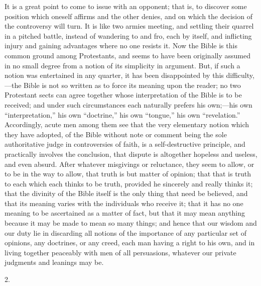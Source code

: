 It is a great point to come to issue with an opponent; that is, to
discover some position which oneself affirms and the other denies, and
on which the decision of the controversy will turn. It is like two
armies meeting, and settling their quarrel in a pitched battle,
instead of wandering to and fro, each by itself, and inflicting injury
and gaining advantages where no one resists it. Now the Bible is this
common ground among Protestants, and seems to have been originally
assumed in no small degree from a notion of its simplicity in
argument. But, if such a notion was entertained in any quarter, it has
been disappointed by this difficulty,—the Bible is not so written as
to force its meaning upon the reader; no two Protestant sects can
agree together whose interpretation of the Bible is to be received;
and under such circumstances each naturally prefers his own;—his own
``interpretation,'' his own ``doctrine,'' his own
``tongue,'' his own ``revelation.'' Accordingly, acute
men among them see that the very elementary notion which they have
adopted, of the Bible without note or comment being the sole
authoritative judge in controversies of faith, is a self-destructive
principle, and practically involves the conclusion, that dispute is
altogether hopeless and useless, and even absurd. After whatever
misgivings or reluctance, they seem to allow, or to be in the way to
allow, that truth is but matter of opinion; that that is truth to each
which each thinks to be truth, provided he sincerely and really thinks
it; that the divinity of the Bible itself is the only thing that need
be believed, and that its meaning varies with the individuals who
receive it; that it has no one meaning to be ascertained as a matter
of fact, but that it may mean anything because it may be made to mean
so many things; and hence that our wisdom and our duty lie in
discarding all notions of the importance of any particular set of
opinions, any doctrines, or any creed, each man having a right to his
own, and in living together peaceably with men of all persuasions,
whatever our private judgments and leanings may be.

2.

